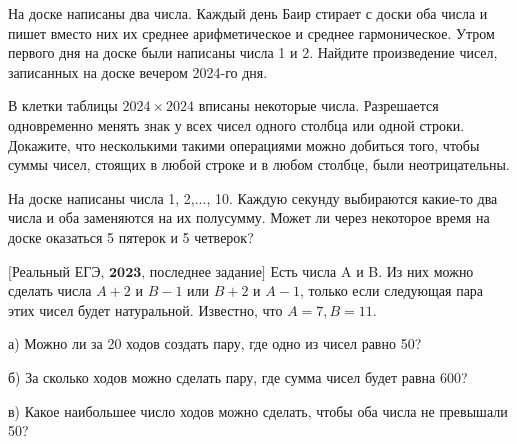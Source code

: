 На доске написаны два числа. Каждый день Баир стирает с доски оба числа и пишет вместо них их среднее арифметическое и среднее гармоническое. Утром первого дня на доске были написаны числа 1 и 2. Найдите произведение чисел, записанных на доске вечером 2024-го дня.


В клетки таблицы  $2024 \times 2024$ вписаны некоторые числа. Разрешается одновременно менять знак у всех чисел одного столбца или одной строки. Докажите, что несколькими такими операциями можно добиться того, чтобы суммы чисел, стоящих в любой строке и в любом столбце, были неотрицательны.


На доске написаны числа 1, 2,..., 10. Каждую секунду выбираются какие-то два числа и оба заменяются на их полусумму. Может ли через некоторое время на доске оказаться 5 пятерок и 5 четверок?


$\bigl[\textbf{Реальный ЕГЭ, 2023, последнее задание}\bigr]$
Есть числа A и B. Из них можно сделать числа $A + 2$ и $B - 1$ или $B + 2$ и $A - 1$, только если следующая пара этих чисел будет натуральной. Известно, что $A = 7, B = 11.$

а) Можно ли за 20 ходов создать пару, где одно из чисел равно 50?

б) За сколько ходов можно сделать пару, где сумма чисел будет равна 600?

в) Какое наибольшее число ходов можно сделать, чтобы оба числа не превышали 50?